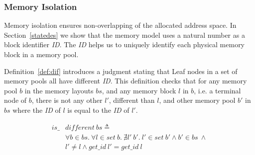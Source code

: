 
\subsubsection{Memory Isolation}
Memory isolation ensures non-overlapping of the allocated address space. In Section~\ref{statedes} we show that the memory model uses a natural number as a block identifier \emph{ID}. The \emph{ID} helps us to uniquely identify each physical memory block in a memory pool.


Definition~\ref{def:dif} introduces a judgment stating that Leaf nodes in a set of memory pools all have different \emph{ID}. This definition checks that for any memory pool $b$ in the memory layouts $bs$, and any memory block $l$ in $b$, i.e. a terminal node of $b$, there is not any other $l'$, different than $l$, and other memory pool $b'$ in $bs$ where the \emph{ID} of $l$ is equal to the \emph{ID} of $l'$.

\begin{definition} 
\label{def:dif}
\end{definition}
\vspace{-7pt}
\begin{align*}
is\_&different\ bs \triangleq\\
&\forall b \in bs.\ \forall l \in set\ b.\ \nexists l'\ b'.\ l' \in set\ b' \wedge b' \in bs\ \wedge\\
&l' \ne l \wedge get\_id\ l' = get\_id\ l
\end{align*}
\vspace{-12pt}

